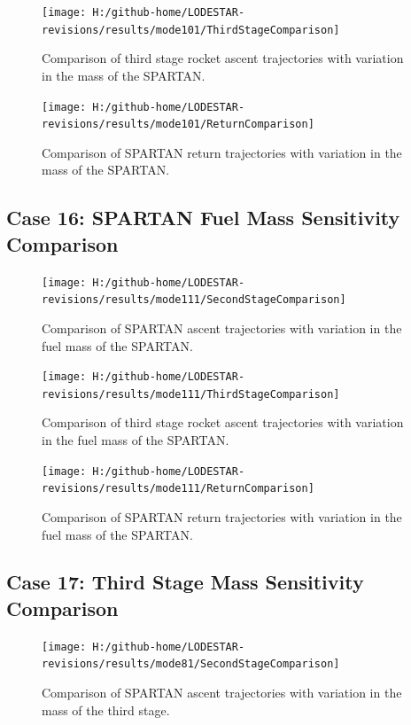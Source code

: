 \begin{figure}[!th]
\centering
\texttt{[image: H:/github-home/LODESTAR-revisions/results/mode101/ThirdStageComparison]}
\caption{Comparison of third stage rocket ascent trajectories with variation in the mass of the SPARTAN.}
\label{fig:ThirdStageComparison12}
\end{figure}

\begin{figure}[!th]
\centering
\texttt{[image: H:/github-home/LODESTAR-revisions/results/mode101/ReturnComparison]}
\caption{Comparison of SPARTAN return trajectories with variation in the mass of the SPARTAN.}
\label{fig:ReturnComparison12}
\end{figure}

\FloatBarrier
\clearpage
\subsection{Case 16: SPARTAN Fuel Mass Sensitivity Comparison}\label{sec:app_comparison111}

\begin{figure}[!th]
\centering
\texttt{[image: H:/github-home/LODESTAR-revisions/results/mode111/SecondStageComparison]}
\caption{Comparison of SPARTAN ascent trajectories with variation in the fuel mass of the SPARTAN.}
\label{fig:SecondStageComparison13}
\end{figure}

\begin{figure}[!th]
\centering
\texttt{[image: H:/github-home/LODESTAR-revisions/results/mode111/ThirdStageComparison]}
\caption{Comparison of third stage rocket ascent trajectories with variation in the fuel mass of the SPARTAN.}
\label{fig:ThirdStageComparison13}
\end{figure}

\begin{figure}[!th]
\centering
\texttt{[image: H:/github-home/LODESTAR-revisions/results/mode111/ReturnComparison]}
\caption{Comparison of SPARTAN return trajectories with variation in the fuel mass of the SPARTAN.}
\label{fig:ReturnComparison13}
\end{figure}


\FloatBarrier
\clearpage
\subsection{Case 17: Third Stage Mass Sensitivity Comparison}\label{sec:app_comparison81}
\begin{figure}[!th]
\centering
\texttt{[image: H:/github-home/LODESTAR-revisions/results/mode81/SecondStageComparison]}
\caption{Comparison of SPARTAN ascent trajectories with variation in the mass of the third stage.}
\label{fig:SecondStageComparison14}
\end{figure}

